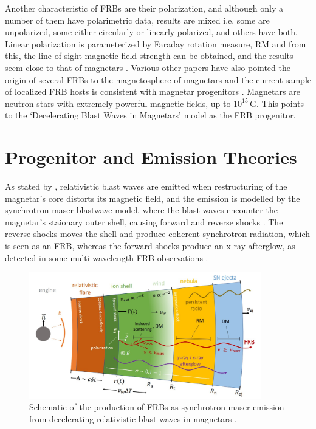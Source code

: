 Another characteristic of FRBs are their polarization, and although only a number of them have polarimetric data, results are mixed i.e. some are unpolarized, some either circularly or linearly polarized, and others have both. Linear polarization is parameterized by Faraday rotation measure, RM and from this, the line-of sight magnetic field strength can be obtained, and the results seem close to that of magnetars \cite{Wang2020}. Various other papers have also pointed the origin of several FRBs to the magnetosphere of magnetars \cite{Luo2020,chime2020} and the current sample of localized FRB hosts is consistent with magnetar progenitors \cite{Bochenek2021}. Magnetars are neutron stars with extremely powerful magnetic fields, up to $10^{15}\,\text{G}$. This points to the `Decelerating Blast Waves in Magnetars' model as the FRB progenitor. 

\section{Progenitor and Emission Theories}

As stated by , relativistic blast waves are emitted when restructuring of the magnetar's core distorts its magnetic field, and the emission is modelled by the synchrotron maser blastwave model, where the blast waves encounter the magnetar's staionary outer shell, causing forward and reverse shocks \cite{Metzger2019}. The reverse shocks moves the shell and produce coherent synchrotron radiation, which is seen as an FRB, whereas the forward shocks produce an x-ray afterglow, as detected in some multi-wavelength FRB observations \cite{Metzger2020}. 

\begin{figure}
    \centering
    \includegraphics[width=0.9\textwidth]{Images/magnetarprog.jpg}
    \caption[FRB synchrotron maser emission]{Schematic of the production of FRBs as synchrotron maser emission from decelerating relativistic blast waves in magnetars \protect\cite{Metzger2019}.}
    \label{fig:prog}
\end{figure}

